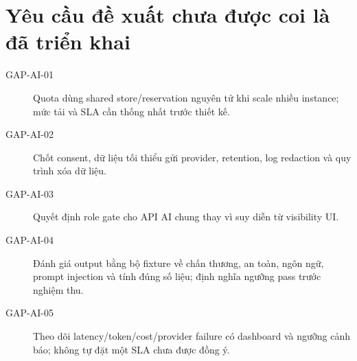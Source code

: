 \documentclass[12pt,a4paper]{article}
\begin{document}
\section{Yêu cầu đề xuất chưa được coi là đã triển khai}
\begin{description}
  \item[GAP-AI-01] Quota dùng shared store/reservation nguyên tử khi scale nhiều instance; mức tải và SLA cần thống nhất trước thiết kế.
  \item[GAP-AI-02] Chốt consent, dữ liệu tối thiểu gửi provider, retention, log redaction và quy trình xóa dữ liệu.
  \item[GAP-AI-03] Quyết định role gate cho API AI chung thay vì suy diễn từ visibility UI.
  \item[GAP-AI-04] Đánh giá output bằng bộ fixture về chấn thương, an toàn, ngôn ngữ, prompt injection và tính đúng số liệu; định nghĩa ngưỡng pass trước nghiệm thu.
  \item[GAP-AI-05] Theo dõi latency/token/cost/provider failure có dashboard và ngưỡng cảnh báo; không tự đặt một SLA chưa được đồng ý.
\end{description}
\end{document}
